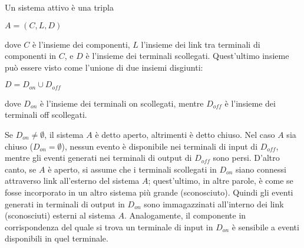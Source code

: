 \begin{defn}
Un sistema attivo è una tripla
\begin{center}
	$ A = (C,L,D)$
\end{center}
dove $C$ è l'insieme dei componenti, $L$ l'insieme dei link tra terminali di componenti in $C$, e $D$ è l'insieme dei terminali scollegati. Quest'ultimo insieme può essere visto come l'unione di due insiemi disgiunti:
\begin{center}
	$ D = D_{on} \cup D_{off}$
\end{center}
dove $D_{on}$ è l'insieme dei terminali on scollegati, mentre $D_{off}$ è l'insieme dei terminali off scollegati. 
\end{defn}
Se $D_{on} \neq \emptyset $, il sistema $A$ è detto aperto, altrimenti è detto chiuso. Nel caso $A$ sia chiuso ($D_{on} = \emptyset$), nessun evento è disponibile nei terminali di input di $D_{off}$, mentre gli eventi generati nei terminali di output di $D_{off}$ sono persi.
D'altro canto, se $A$ è aperto, si assume che i terminali scollegati in $D_{on}$ siano connessi attraverso link all'esterno del sistema $A$; quest'ultimo, in altre parole, è come se fosse incorporato in un altro sistema più grande (sconosciuto). Quindi gli eventi generati in terminali di output in $D_{on}$ sono immagazzinati all'interno dei link (sconosciuti) esterni al sistema $A$. Analogamente, il componente in corrispondenza del quale si trova un terminale di input in $D_{on}$ è sensibile a eventi disponibili in quel terminale.

